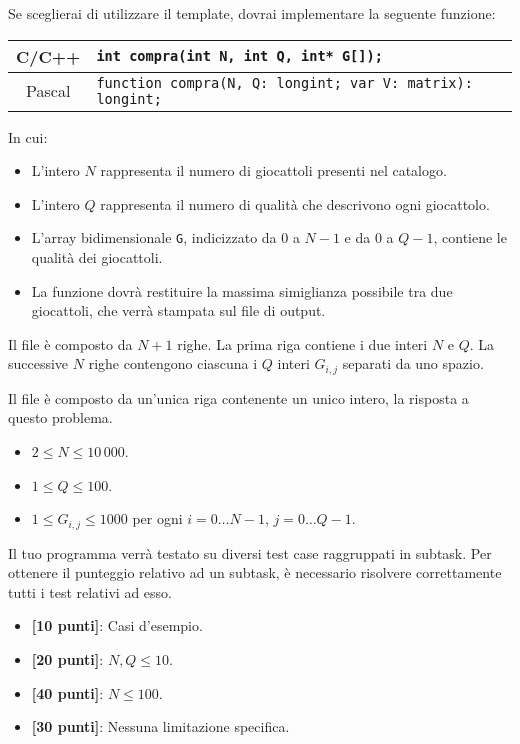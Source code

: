 Se sceglierai di utilizzare il template, dovrai implementare la seguente funzione:
\begin{center}\begin{tabularx}{\textwidth}{|c|X|}
\hline
C/C++  & \verb|int compra(int N, int Q, int* G[]);|\\
\hline
Pascal & \verb|function compra(N, Q: longint; var V: matrix): longint;|\\
\hline
\end{tabularx}\end{center}
In cui:
\begin{itemize}[nolistsep]
  \item L'intero $N$ rappresenta il numero di giocattoli presenti nel catalogo.
  \item L'intero $Q$ rappresenta il numero di qualit\`a che descrivono ogni giocattolo.
  \item L'array bidimensionale \texttt{G}, indicizzato da $0$ a $N-1$ e da $0$ a $Q-1$, contiene le qualit\`a dei giocattoli.
  \item La funzione dovrà restituire la massima simiglianza possibile tra due giocattoli, che verrà stampata sul file di output.
\end{itemize}

\InputFile
Il file  è composto da $N+1$ righe. La prima riga contiene i due interi $N$ e $Q$. La successive $N$ righe contengono ciascuna i $Q$ interi $G_{i,j}$ separati da uno spazio.

\OutputFile
Il file \outputfile{} è composto da un'unica riga contenente un unico intero, la risposta a questo problema.

\Constraints
\begin{itemize}[nolistsep, itemsep=2mm]
	\item $2 \le N \le 10\,000$.
	\item $1 \le Q \le 100$.
	\item $1 \le G_{i,j} \le 1000$ per ogni $i=0\ldots N-1$, $j=0\ldots Q-1$.
\end{itemize}

\Scoring
Il tuo programma verrà testato su diversi test case raggruppati in subtask.
Per ottenere il punteggio relativo ad un subtask, è necessario risolvere
correttamente tutti i test relativi ad esso.

\begin{itemize}[nolistsep,itemsep=2mm]
  \item \textbf{ [10 punti]}: Casi d'esempio.
  \item \textbf{ [20 punti]}: $N,Q \leq 10$.
  \item \textbf{ [40 punti]}: $N \leq 100$.
  \item \textbf{ [30 punti]}: Nessuna limitazione specifica.
\end{itemize}

